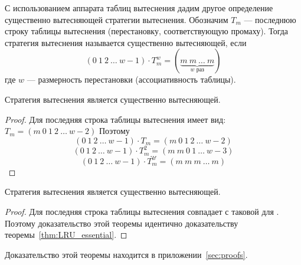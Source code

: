 С использованием аппарата таблиц вытеснения дадим другое определение существенно вытесняющей стратегии вытеснения. Обозначим $T_m$ --- последнюю строку таблицы вытеснения (перестановку, соответствующую промаху). Тогда стратегия вытеснения называется существенно вытесняющей, если $$(0~1~2~\dots~w{-}1) \cdot T_m^w = (\underbrace{m~m~\dots~m}_{\mbox{$w$~раз}})$$ где $w$ --- размерность перестановки (ассоциативность таблицы).

\begin{theorem}\label{thm:LRU_essential}
  Стратегия вытеснения \LRU является существенно вытесняющей.
\end{theorem}
\begin{proof}
  Для \LRU последняя строка таблицы вытеснения имеет вид: $T_m = (m~0~1~2~\dots~w{-}2)$ Поэтому
  $$(0~1~2~\dots~w{-}1) \cdot T_m = (m~0~1~2~\dots~w{-}2)$$
  $$(0~1~2~\dots~w{-}1) \cdot T_m^2 = (m~m~0~1~\dots~w{-}3)$$
  $$\mbox{...}$$
  $$(0~1~2~\dots~w{-}1) \cdot T_m^w = (m~m~m~\dots~m)$$
\end{proof}

\begin{theorem}
  Стратегия вытеснения \FIFO является существенно вытесняющей.
\end{theorem}
\begin{proof}
  Для \FIFO последняя строка таблицы вытеснения совпадает с таковой для \LRU. Поэтому доказательство этой теоремы идентично доказательству теоремы~\ref{thm:LRU_essential}.
\end{proof}

\begin{theorem}\label{thm:PseudoLRU_essential} \PseudoLRUEssential \end{theorem}

Доказательство этой теоремы находится в приложении~\ref{sec:proofs}.

